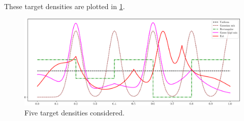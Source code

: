 These target densities are plotted in \cref{fig:target_densities}.
\begin{figure}[h]
\includegraphics[width=1.1\textwidth]{TeX_files/densities_f_star.png}
\caption{Five target densities considered.}
\label{fig:target_densities}
\end{figure}

